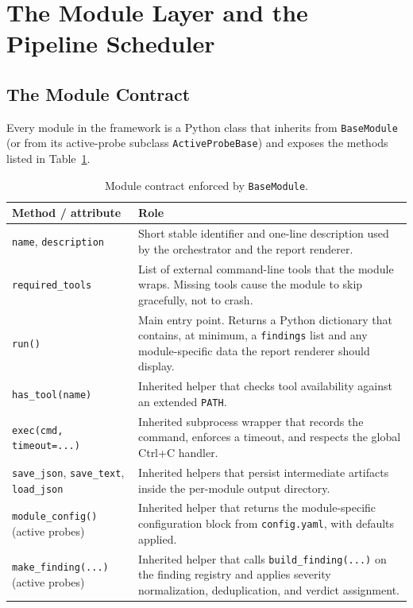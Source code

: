 \section{The Module Layer and the Pipeline Scheduler}
\label{sec:pipeline}

\subsection{The Module Contract}

Every module in the framework is a Python class that inherits from \texttt{BaseModule} (or from its active-probe subclass \texttt{ActiveProbeBase}) and exposes the methods listed in Table~\ref{tab:module-contract}.

\begin{table}[h]
\centering
\small
\begin{tabular}{|p{4.2cm}|p{8.8cm}|}
\hline
\textbf{Method / attribute} & \textbf{Role} \\
\hline
\texttt{name}, \texttt{description} & Short stable identifier and one-line description used by the orchestrator and the report renderer. \\
\texttt{required\_tools} & List of external command-line tools that the module wraps. Missing tools cause the module to skip gracefully, not to crash. \\
\texttt{run()} & Main entry point. Returns a Python dictionary that contains, at minimum, a \texttt{findings} list and any module-specific data the report renderer should display. \\
\texttt{has\_tool(name)} & Inherited helper that checks tool availability against an extended \texttt{PATH}. \\
\texttt{exec(cmd, timeout=...)} & Inherited subprocess wrapper that records the command, enforces a timeout, and respects the global Ctrl+C handler. \\
\texttt{save\_json}, \texttt{save\_text}, \texttt{load\_json} & Inherited helpers that persist intermediate artifacts inside the per-module output directory. \\
\texttt{module\_config()} (active probes) & Inherited helper that returns the module-specific configuration block from \texttt{config.yaml}, with defaults applied. \\
\texttt{make\_finding(...)} (active probes) & Inherited helper that calls \texttt{build\_finding(...)} on the finding registry and applies severity normalization, deduplication, and verdict assignment. \\
\hline
\end{tabular}
\caption{Module contract enforced by \texttt{BaseModule}.}
\label{tab:module-contract}
\end{table}

